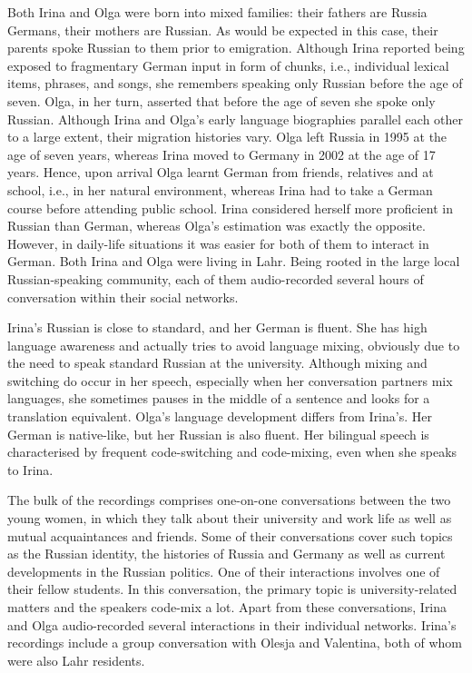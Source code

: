 Both Irina and Olga were born into mixed families: their fathers are Russia Germans, their mothers are Russian. As would be expected in this case, their parents spoke Russian to them prior to emigration. Although Irina reported being exposed to fragmentary German input in form of chunks, i.e., individual lexical items, phrases, and songs, she remembers speaking only Russian before the age of seven. Olga, in her turn, asserted that before the age of seven she spoke only Russian. Although Irina and Olga's early language biographies parallel each other to a large extent, their migration histories vary. Olga left Russia in 1995 at the age of seven years, whereas Irina moved to Germany in 2002 at the age of 17 years. Hence, upon arrival Olga learnt German from friends, relatives and at school, i.e., in her natural environment, whereas Irina had to take a German course before attending public school.
Irina considered herself more proficient in Russian than German, whereas Olga's estimation was exactly the opposite. However, in daily-life situations it was easier for both of them to interact in German. Both Irina and Olga were living in Lahr. Being rooted in the large local Russian-speaking community, each of them audio-recorded several hours of conversation within their social networks. 

Irina's Russian is close to standard, and her German is fluent. She has high language awareness and actually tries to avoid language mixing, obviously due to the need to speak standard Russian at the university. Although mixing and switching do occur in her speech, especially when her conversation partners mix languages, she sometimes pauses in the middle of a sentence and looks for a translation equivalent. Olga's language development differs from Irina's. Her German is native-like, but her Russian is also fluent. Her bilingual speech is characterised by frequent code-switching and code-mixing, even when she speaks to Irina.

The bulk of the recordings comprises one-on-one conversations between the two young women, in which they talk about their university and work life as well as mutual acquaintances and friends. Some of their conversations cover such topics as the Russian identity, the histories of Russia and Germany as well as current developments in the Russian politics. One of their interactions involves one of their fellow students. In this conversation, the primary topic is university-related matters and the speakers code-mix a lot. Apart from these conversations, Irina and Olga audio-recorded several interactions in their individual networks. Irina's recordings include a group conversation with Olesja and Valentina, both of whom were also Lahr residents.


